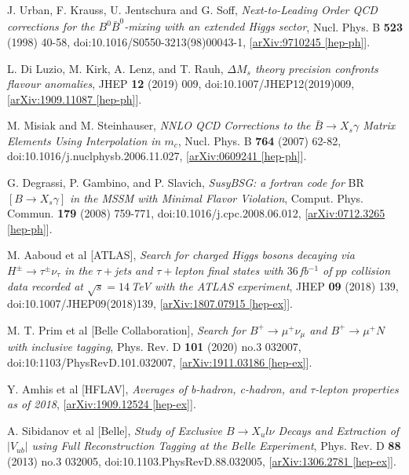 \documentclass[a4paper,12pt]{article}
\begin{document}
\begin{thebibliography}{99}
J. Urban, F. Krauss, U. Jentschura and G. Soff, \emph{Next-to-Leading Order QCD corrections for the $B^0\bar{B}^0$-mixing with an extended Higgs sector}, Nucl. Phys. B \textbf{523} (1998) 40-58, doi:10.1016/S0550-3213(98)00043-1, [\href{https://arxiv.org/abs/hep-ph/9710245}{arXiv:9710245 [hep-ph]}].

L. Di Luzio, M. Kirk, A. Lenz, and T. Rauh, \emph{$\Delta M_s$ theory precision confronts flavour anomalies}, JHEP \textbf{12} (2019) 009, doi:10.1007/JHEP12(2019)009, [\href{https://arxiv.org/abs/1909.11087}{arXiv:1909.11087 [hep-ph]}].

M. Misiak and M. Steinhauser, \emph{NNLO QCD Corrections to the $\bar{B}\to X_s\gamma$ Matrix Elements Using Interpolation in $m_c$}, Nucl. Phys. B \textbf{764} (2007) 62-82, doi:10.1016/j.nuclphysb.2006.11.027, [\href{https://arxiv.org/abs/hep-ph/0609241}{arXiv:0609241 [hep-ph]}].

G. Degrassi, P. Gambino, and P. Slavich, \emph{SusyBSG: a fortran code for} BR$[B\to X_s\gamma]$ \emph{in the MSSM with Minimal Flavor Violation}, Comput. Phys. Commun. \textbf{179} (2008) 759-771, doi:10.1016/j.cpc.2008.06.012, [\href{https://arxiv.org/abs/0712.3265}{arXiv:0712.3265 [hep-ph]}].

M. Aaboud et al [ATLAS], \emph{Search for charged Higgs bosons decaying via $H^{\pm}\to\tau^\pm\nu_\tau$ in the $\tau+$jets and $\tau+$lepton final states with $36\,$fb$^{-1}$ of $pp$ collision data recorded at $\sqrt{s}=14\,$TeV with the ATLAS experiment}, JHEP \textbf{09} (2018) 139, doi:10.1007/JHEP09(2018)139, [\href{https://arxiv.org/abs/1807.07915}{arXiv:1807.07915 [hep-ex]}].

M. T. Prim et al [Belle Collaboration], \emph{Search for $B^+\to\mu^+\nu_\mu$ and $B^+\to\mu^+N$ with inclusive tagging}, Phys. Rev. D \textbf{101} (2020) no.3 032007, doi:10:1103/PhysRevD.101.032007, [\href{https://arxiv.org/abs/1911.03186}{arXiv:1911.03186 [hep-ex]}].

Y. Amhis et al [HFLAV], \emph{Averages of b-hadron, c-hadron, and $\tau$-lepton properties as of 2018}, [\href{https://arxiv.org/abs/1909.12524}{arXiv:1909.12524 [hep-ex]}].

A. Sibidanov et al [Belle], \emph{Study of Exclusive $B\to X_ul\nu$ Decays and Extraction of $|V_{ub}|$ using Full Reconstruction Tagging at the Belle Experiment}, Phys. Rev. D \textbf{88} (2013) no.3 032005, doi:10.1103.PhysRevD.88.032005, [\href{https://arxiv.org/abs/1306.2781}{arXiv:1306.2781 [hep-ex]}].


\end{thebibliography}
\end{document}
